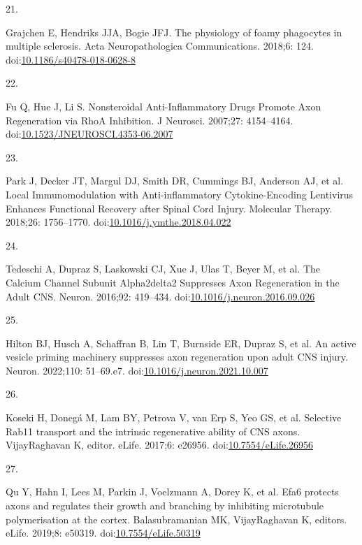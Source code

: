 \documentclass[
  12pt,
  a4paper,
]{book}
\newlength{\cslhangindent}
\newlength{\csllabelwidth}
\newlength{\cslentryspacingunit} %
\newenvironment{CSLReferences}[2] %
 {%
  \setlength{\parindent}{0pt}
  \ifodd #1
  \let\oldpar\par
  \def\par{\hangindent=\cslhangindent\oldpar}
  \fi
  \setlength{\parskip}{#2\cslentryspacingunit}
 }%
 {}
\newcommand{\CSLLeftMargin}[1]{\parbox[t]{\csllabelwidth}{#1}}
\newcommand{\CSLRightInline}[1]{\parbox[t]{\linewidth - \csllabelwidth}{#1}\break}
\begin{document}
\begin{CSLReferences}{0}{0}
\leavevmode{}%
\CSLLeftMargin{21. }%
\CSLRightInline{Grajchen E, Hendriks JJA, Bogie JFJ. The physiology of foamy phagocytes in multiple sclerosis. Acta Neuropathologica Communications. 2018;6: 124. doi:\href{https://doi.org/10.1186/s40478-018-0628-8}{10.1186/s40478-018-0628-8}}

\leavevmode{}%
\CSLLeftMargin{22. }%
\CSLRightInline{Fu Q, Hue J, Li S. Nonsteroidal {Anti-Inflammatory Drugs Promote Axon Regeneration} via {RhoA Inhibition}. J Neurosci. 2007;27: 4154--4164. doi:\href{https://doi.org/10.1523/JNEUROSCI.4353-06.2007}{10.1523/JNEUROSCI.4353-06.2007}}

\leavevmode{}%
\CSLLeftMargin{23. }%
\CSLRightInline{Park J, Decker JT, Margul DJ, Smith DR, Cummings BJ, Anderson AJ, et al. Local {Immunomodulation} with {Anti-inflammatory Cytokine-Encoding Lentivirus Enhances Functional Recovery} after {Spinal Cord Injury}. Molecular Therapy. 2018;26: 1756--1770. doi:\href{https://doi.org/10.1016/j.ymthe.2018.04.022}{10.1016/j.ymthe.2018.04.022}}

\leavevmode{}%
\CSLLeftMargin{24. }%
\CSLRightInline{Tedeschi A, Dupraz S, Laskowski CJ, Xue J, Ulas T, Beyer M, et al. The {Calcium Channel Subunit Alpha2delta2 Suppresses Axon Regeneration} in the {Adult CNS}. Neuron. 2016;92: 419--434. doi:\href{https://doi.org/10.1016/j.neuron.2016.09.026}{10.1016/j.neuron.2016.09.026}}

\leavevmode{}%
\CSLLeftMargin{25. }%
\CSLRightInline{Hilton BJ, Husch A, Schaffran B, Lin T, Burnside ER, Dupraz S, et al. An active vesicle priming machinery suppresses axon regeneration upon adult {CNS} injury. Neuron. 2022;110: 51--69.e7. doi:\href{https://doi.org/10.1016/j.neuron.2021.10.007}{10.1016/j.neuron.2021.10.007}}

\leavevmode{}%
\CSLLeftMargin{26. }%
\CSLRightInline{Koseki H, Donegá M, Lam BY, Petrova V, van Erp S, Yeo GS, et al. Selective Rab11 transport and the intrinsic regenerative ability of {CNS} axons. VijayRaghavan K, editor. eLife. 2017;6: e26956. doi:\href{https://doi.org/10.7554/eLife.26956}{10.7554/eLife.26956}}

\leavevmode{}%
\CSLLeftMargin{27. }%
\CSLRightInline{Qu Y, Hahn I, Lees M, Parkin J, Voelzmann A, Dorey K, et al. Efa6 protects axons and regulates their growth and branching by inhibiting microtubule polymerisation at the cortex. Balasubramanian MK, VijayRaghavan K, editors. eLife. 2019;8: e50319. doi:\href{https://doi.org/10.7554/eLife.50319}{10.7554/eLife.50319}}


\end{CSLReferences}
\end{document}
